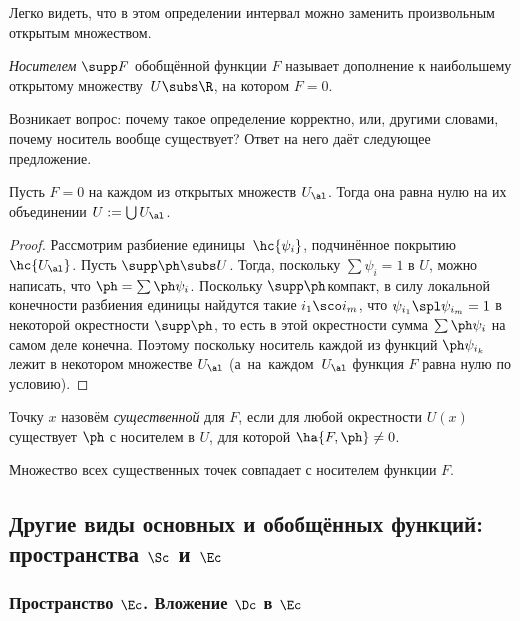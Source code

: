 \documentclass[a4paper]{article}
\begin{document}
Легко видеть, что в этом определении интервал можно заменить произвольным
открытым множеством.

\begin{df}
\emph{Носителем} $\supp F$ обобщённой функции $F$ называет дополнение к наибольшему открытому множеству~$U \subs \R$,
на котором $F = 0$.
\end{df}

Возникает вопрос: почему такое определение корректно, или, другими словами, почему носитель вообще существует?
Ответ на него даёт следующее предложение.

\begin{prop}
Пусть $F = 0$ на каждом из открытых множеств $U_\al$. Тогда она равна нулю на их объединении $U := \bigcup U_\al$.
\end{prop}
\begin{proof}
Рассмотрим разбиение единицы~$\hc{\psi_i}$, подчинённое покрытию $\hc{U_\al}$.
Пусть $\supp \ph \subs U$. Тогда, поскольку $\sum \psi_i = 1$ в $U$, можно написать,
что $\ph = \sum\ph\psi_i$. Поскольку $\supp\ph$\т компакт, в силу локальной конечности
разбиения единицы найдутся такие $i_1\sco i_m$, что $\psi_{i_1}\spl \psi_{i_m} = 1$ в некоторой
окрестности $\supp \ph$, то есть в этой окрестности сумма $\sum\ph\psi_i$ на самом деле
конечна. Поэтому
поскольку носитель каждой из функций $\ph\psi_{i_k}$ лежит в некотором множестве $U_\al$ (а~на~каждом~$U_\al$
функция $F$ равна нулю по условию).
\end{proof}

\begin{df}
Точку $x$ назовём \emph{существенной} для $F$, если для любой окрестности $U(x)$ существует $\ph$
с носителем в $U$, для которой $\ha{F,\ph} \neq 0$.
\end{df}

\begin{problem}
Множество всех существенных точек совпадает с носителем функции $F$.
\end{problem}

\subsection{Другие виды основных и обобщённых функций: пространства $\Sc$ и $\Ec$}

\subsubsection{Пространство $\Ec$. Вложение $\Dc$ в $\Ec$}
\end{document}

